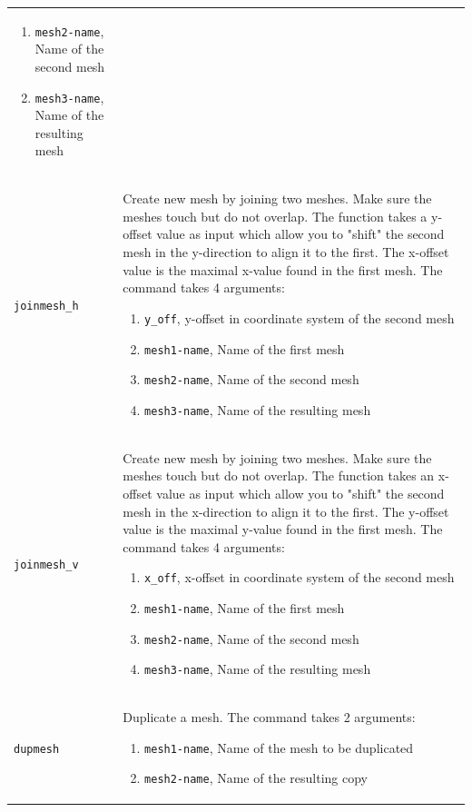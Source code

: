 \documentclass[noshowpacs,preprintnumbers,amsmath,amssymb, letter]{revtex4}
\begin{document}
\begin{longtable}{p{}p{}}
\begin{enumerate}
\item \texttt{mesh2-name}, Name of the second mesh
\item \texttt{mesh3-name}, Name of the resulting mesh
\end{enumerate}\\
\texttt{joinmesh\_h}	& Create new mesh by joining two meshes. Make sure the meshes touch but do not overlap. The function takes a y-offset value as input which allow you to "shift" the second mesh in the y-direction to align it to the first. The x-offset value is the maximal x-value found in the first mesh. The command takes 4 arguments:
\begin{enumerate}
\item \texttt{y\_off}, y-offset in coordinate system of the second mesh 
\item \texttt{mesh1-name}, Name of the first mesh
\item \texttt{mesh2-name}, Name of the second mesh
\item \texttt{mesh3-name}, Name of the resulting mesh
\end{enumerate}\\
\texttt{joinmesh\_v}	& Create new mesh by joining two meshes. Make sure the meshes touch but do not overlap. The function takes an x-offset value as input which allow you to "shift" the second mesh in the x-direction to align it to the first. The y-offset value is the maximal y-value found in the first mesh. The command takes 4 arguments:
\begin{enumerate}
\item \texttt{x\_off}, x-offset in coordinate system of the second mesh 
\item \texttt{mesh1-name}, Name of the first mesh
\item \texttt{mesh2-name}, Name of the second mesh
\item \texttt{mesh3-name}, Name of the resulting mesh
\end{enumerate}\\
\texttt{dupmesh}	& Duplicate a mesh. The command takes 2 arguments:
\begin{enumerate}
\item \texttt{mesh1-name}, Name of the mesh to be duplicated
\item \texttt{mesh2-name}, Name of the resulting copy
\end{enumerate}\\

\end{longtable}
\end{document}
